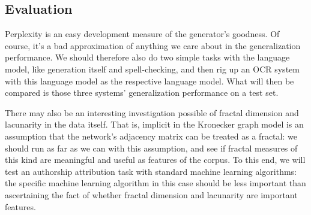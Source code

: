 \documentclass[12pt]{article}
\begin{document}
\subsection{Evaluation}
Perplexity is an easy development measure of the generator's goodness. Of course, it's a bad approximation of anything we care about in the generalization performance. We should therefore also do two simple tasks with the language model, like generation itself and spell-checking, and then rig up an OCR system with this language model as the respective language model. What will then be compared is those three systems' generalization performance on a test set.

There may also be an interesting investigation possible of fractal dimension and lacunarity in the data itself. That is, implicit in the Kronecker graph model is an assumption that the network's adjacency matrix can be treated as a fractal: we should run as far as we can with this assumption, and see if fractal measures of this kind are meaningful and useful as features of the corpus. To this end, we will test an authorship attribution task with standard machine learning algorithms: the specific machine learning algorithm in this case should be less important than ascertaining the fact of whether fractal dimension and lacunarity are important features.

\end{document}
